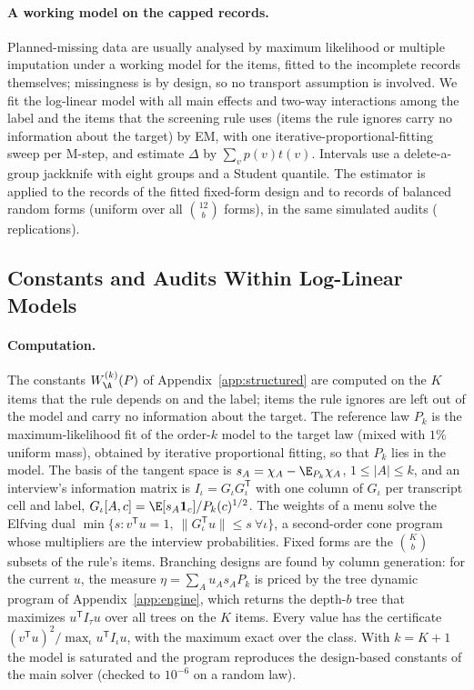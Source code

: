 \paragraph{A working model on the capped records.}
Planned-missing data are usually analysed by maximum likelihood or multiple imputation under a working model for the items, fitted to the incomplete records themselves; missingness is by design, so no transport assumption is involved. We fit the log-linear model with all main effects and two-way interactions among the label and the items that the screening rule uses (items the rule ignores carry no information about the target) by EM, with one iterative-proportional-fitting sweep per M-step, and estimate $\Delta$ by $\sum_vp(v)t(v)$. Intervals use a delete-a-group jackknife with eight groups and a Student quantile. The estimator is applied to the records of the fitted fixed-form design and to records of balanced random forms (uniform over all $\binom{12}b$ forms), in the same simulated audits (\nEmReps{} replications).

\nEmAppendixText

\subsection{Constants and Audits Within Log-Linear Models}\label{app:modelexp}
\paragraph{Computation.}
The constants $W^{(k)}_\A(P)$ of Appendix~\ref{app:structured} are computed on the $K$ items that the rule depends on and the label; items the rule ignores are left out of the model and carry no information about the target. The reference law $P_k$ is the maximum-likelihood fit of the order-$k$ model to the target law (mixed with $1\%$ uniform mass), obtained by iterative proportional fitting, so that $P_k$ lies in the model. The basis of the tangent space is $s_A=\chi_A-\E_{P_k}\chi_A$, $1\le|A|\le k$, and an interview's information matrix is $I_\iota=G_\iota G_\iota^{\mathsf T}$ with one column of $G_\iota$ per transcript cell and label, $G_\iota[A,c]=\E[s_A\mathbf 1_c]/P_k(c)^{1/2}$. The weights of a menu solve the Elfving dual $\min\{s:v^{\mathsf T}u=1,\ \|G_\iota^{\mathsf T}u\|\le s\ \forall\iota\}$, a second-order cone program whose multipliers are the interview probabilities. Fixed forms are the $\binom Kb$ subsets of the rule's items. Branching designs are found by column generation: for the current $u$, the measure $\eta=\sum_Au_As_AP_k$ is priced by the tree dynamic program of Appendix~\ref{app:engine}, which returns the depth-$b$ tree that maximizes $u^{\mathsf T}I_\tau u$ over all trees on the $K$ items. Every value has the certificate $(v^{\mathsf T}u)^2/\max_\iota u^{\mathsf T}I_\iota u$, with the maximum exact over the class. With $k=K+1$ the model is saturated and the program reproduces the design-based constants of the main solver (checked to $10^{-6}$ on a random law).

